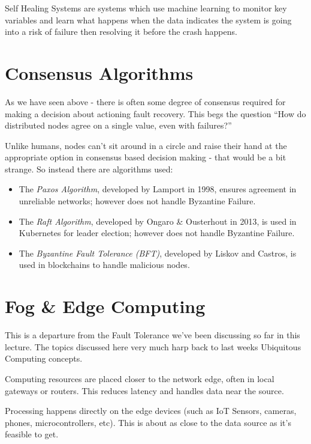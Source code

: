 Self Healing Systems are systems which use machine learning to monitor key variables and learn what happens when the data indicates the system is going into a risk of failure then resolving it before the crash happens. 

\section{Consensus Algorithms}
As we have seen above - there is often some degree of consensus required for making a decision about actioning fault recovery. This begs the question ``How do distributed nodes agree on a single value, even with failures?''

Unlike humans, nodes can't sit around in a circle and raise their hand at the appropriate option in consensus based decision making - that would be a bit strange. So instead there are algorithms used:
\begin{itemize}
    \item The \textit{Paxos Algorithm}, developed by Lamport in 1998, ensures agreement in unreliable networks; however does not handle Byzantine Failure.
    \item The \textit{Raft Algorithm}, developed by Ongaro \& Ousterhout in 2013, is used in Kubernetes for leader election; however does not handle Byzantine Failure.
    \item The \textit{Byzantine Fault Tolerance (BFT)}, developed by Liskov and Castros, is used in blockchains to handle malicious nodes.
\end{itemize}

\section{Fog \& Edge Computing}
This is a departure from the Fault Tolerance we've been discussing so far in this lecture. The topics discussed here very much harp back to last weeks Ubiquitous Computing concepts.

\begin{define}
    \item[Fog] Computing resources are placed closer to the network edge, often in local gateways or routers. This reduces latency and handles data near the source.
    \item[Edge] Processing happens directly on the edge devices (such as IoT Sensors, cameras, phones, microcontrollers, etc). This is about as close to the data source as it's feasible to get.
\end{define}

